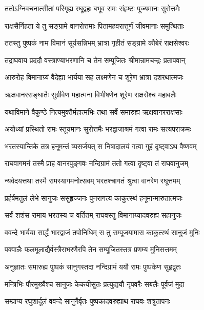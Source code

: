
\twolineshloka
{ततोऽग्निवचनात्सीतां परिगृह्य रघूद्वहः}
{बभूव रामः संहृष्टः पूज्यमानः सुरोत्तमैः}%

\twolineshloka
{राक्षसैर्निहता ये तु सङ्ग्रामे वानरोत्तमाः}
{पितामहवरात्तूर्णं जीवमानाः समुत्थिताः}%

\twolineshloka
{ततस्तु पुष्पकं नाम विमानं सूर्यसन्निभम्}
{भ्रात्रा गृहीतं सङ्ग्रामे कौबेरं राक्षसेश्वरः}%

\twolineshloka
{तद्राघवाय प्रददौ वस्त्राण्याभरणानि च}
{तेन सम्पूजितः श्रीमान्रामचन्द्रः प्रतापवान्}%

\twolineshloka
{आरुरोह विमानाग्र्यं वैदेह्या भार्यया सह}
{लक्ष्मणेन च शूरेण भ्रात्रा दशरथात्मजः}%

\twolineshloka
{ऋक्षवानरसङ्घातैः सुग्रीवेण महात्मना}
{विभीषणेन शूरेण राक्षसैश्च महाबलैः}%

\twolineshloka
{यथाविमाने वैकुण्ठे नित्यमुक्तैर्महात्मभिः}
{तथा सर्वे समारुह्य ऋक्षवानरराक्षसाः}%

\twolineshloka
{अयोध्यां प्रस्थितो रामः स्तूयमानः सुरोत्तमैः}
{भरद्वाजाश्रमं गत्वा रामः सत्यपराक्रमः}%

\twolineshloka
{भरतस्यान्तिके तत्र हनूमन्तं व्यसर्जयत्}
{स निषादालयं गत्वा गुहं दृष्ट्वाऽथ वैष्णवम्}%

\twolineshloka
{राघवागमनं तस्मै प्राह वानरपुङ्गवः}
{नन्दिग्रामं ततो गत्वा दृष्ट्वा तं राघवानुजम्}%

\twolineshloka
{न्यवेदयत्तथा तस्मै रामस्यागमनोत्सवम्}
{भरतश्चागतं श्रुत्वा वानरेण रघूत्तमम्}%

\twolineshloka
{प्रर्हर्षमतुलं लेभे सानुजः ससुहृज्जनः}
{पुनरागत्य काकुत्स्थं हनूमान्मारुतात्मजः}%

\twolineshloka
{सर्वं शशंस रामाय भरतस्य च वर्तितम्}
{राघवस्तु विमानाग्र्यादवरुह्य सहानुजः}%

\twolineshloka
{ववन्दे भार्यया सार्द्धं भारद्वाजं तपोनिधिम्}
{स तु सम्पूजयामास काकुत्स्थं सानुजं मुनिः}%

\twolineshloka
{पक्वान्नैः फलमूलाद्यैर्वस्त्रैराभरणैरपि}
{तेन सम्पूजितस्तत्र प्रणम्य मुनिसत्तमम्}%

\twolineshloka
{अनुज्ञातः समारुह्य पुष्पकं सानुगस्तदा}
{नन्दिग्रामं ययौ रामः पुष्पकेण सुहृद्वृतः}%

\twolineshloka
{मन्त्रिभिः पौरमुख्यैश्च सानुजः केकयीसुतः}
{प्रत्युद्ययौ नृपवरैः सबलैः पूर्वजं मुदा}%

\twolineshloka
{सम्प्राप्य रघुशार्दूलं ववन्दे सानुगैर्वृतः}
{पुष्पकादवरुह्याथ राघवः शत्रुतापनः}%

